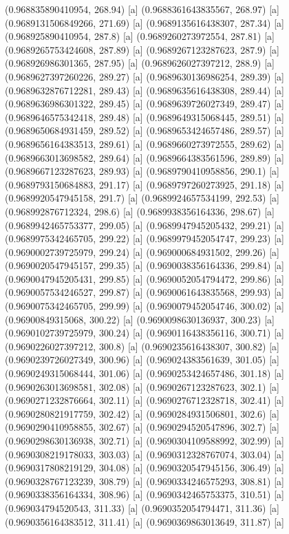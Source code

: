 {{{(0.968835890410954, 268.94) [a] 
(0.9688361643835567, 268.97) [a] 
(0.9689131506849266, 271.69) [a] 
(0.9689135616438307, 287.34) [a] 
(0.968925890410954, 287.8) [a] 
(0.9689260273972554, 287.81) [a] 
(0.9689265753424608, 287.89) [a] 
(0.9689267123287623, 287.9) [a] 
(0.968926986301365, 287.95) [a] 
(0.9689626027397212, 288.9) [a] 
(0.9689627397260226, 289.27) [a] 
(0.9689630136986254, 289.39) [a] 
(0.9689632876712281, 289.43) [a] 
(0.9689635616438308, 289.44) [a] 
(0.9689636986301322, 289.45) [a] 
(0.9689639726027349, 289.47) [a] 
(0.9689646575342418, 289.48) [a] 
(0.9689649315068445, 289.51) [a] 
(0.9689650684931459, 289.52) [a] 
(0.9689653424657486, 289.57) [a] 
(0.9689656164383513, 289.61) [a] 
(0.9689660273972555, 289.62) [a] 
(0.9689663013698582, 289.64) [a] 
(0.9689664383561596, 289.89) [a] 
(0.9689667123287623, 289.93) [a] 
(0.9689790410958856, 290.1) [a] 
(0.9689793150684883, 291.17) [a] 
(0.9689797260273925, 291.18) [a] 
(0.9689920547945158, 291.7) [a] 
(0.9689924657534199, 292.53) [a] 
(0.968992876712324, 298.6) [a] 
(0.9689938356164336, 298.67) [a] 
(0.9689942465753377, 299.05) [a] 
(0.9689947945205432, 299.21) [a] 
(0.9689975342465705, 299.22) [a] 
(0.9689979452054747, 299.23) [a] 
(0.9690002739725979, 299.24) [a] 
(0.969000684931502, 299.26) [a] 
(0.9690020547945157, 299.35) [a] 
(0.9690038356164336, 299.84) [a] 
(0.9690047945205431, 299.85) [a] 
(0.9690052054794472, 299.86) [a] 
(0.9690057534246527, 299.87) [a] 
(0.9690061643835568, 299.93) [a] 
(0.9690075342465705, 299.99) [a] 
(0.9690079452054746, 300.02) [a] 
(0.96900849315068, 300.22) [a] 
(0.9690098630136937, 300.23) [a] 
(0.9690102739725979, 300.24) [a] 
(0.9690116438356116, 300.71) [a] 
(0.9690226027397212, 300.8) [a] 
(0.9690235616438307, 300.82) [a] 
(0.9690239726027349, 300.96) [a] 
(0.969024383561639, 301.05) [a] 
(0.9690249315068444, 301.06) [a] 
(0.9690253424657486, 301.18) [a] 
(0.9690263013698581, 302.08) [a] 
(0.9690267123287623, 302.1) [a] 
(0.9690271232876664, 302.11) [a] 
(0.9690276712328718, 302.41) [a] 
(0.9690280821917759, 302.42) [a] 
(0.9690284931506801, 302.6) [a] 
(0.9690290410958855, 302.67) [a] 
(0.9690294520547896, 302.7) [a] 
(0.9690298630136938, 302.71) [a] 
(0.9690304109588992, 302.99) [a] 
(0.9690308219178033, 303.03) [a] 
(0.9690312328767074, 303.04) [a] 
(0.9690317808219129, 304.08) [a] 
(0.9690320547945156, 306.49) [a] 
(0.9690328767123239, 308.79) [a] 
(0.9690334246575293, 308.81) [a] 
(0.9690338356164334, 308.96) [a] 
(0.9690342465753375, 310.51) [a] 
(0.969034794520543, 311.33) [a] 
(0.9690352054794471, 311.36) [a] 
(0.9690356164383512, 311.41) [a] 
(0.9690369863013649, 311.87) [a] 
}}}
